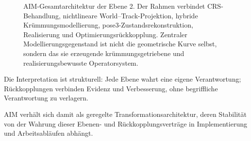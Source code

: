\begin{figure}[ht]
\caption{AIM-Gesamtarchitektur der Ebene 2. Der Rahmen verbindet CRS-Behandlung, nichtlineare World--Track-Projektion, hybride Krümmungsmodellierung, pose3-Zustandsrekonstruktion, Realisierung und Optimierungsrückkopplung. Zentraler Modellierungsgegenstand ist nicht die geometrische Kurve selbst, sondern das sie erzeugende krümmungsgetriebene und realisierungsbewusste Operatorsystem.}
\end{figure}

Die Interpretation ist strukturell: Jede Ebene wahrt eine eigene
Verantwortung; Rückkopplungen verbinden Evidenz und Verbesserung, ohne
begriffliche Verantwortung zu verlagern.

AIM verhält sich damit als geregelte Transformationsarchitektur, deren
Stabilität von der Wahrung dieser Ebenen- und Rückkopplungsverträge in
Implementierung und Arbeitsabläufen abhängt.
